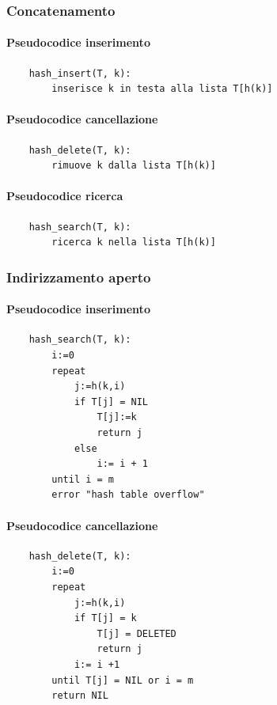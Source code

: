 \documentclass{article}
\begin{document}
\subsubsection{Concatenamento}

\paragraph{Pseudocodice inserimento}
\begin{verbatim}
    hash_insert(T, k):
        inserisce k in testa alla lista T[h(k)]
\end{verbatim}

\paragraph{Pseudocodice cancellazione}
\begin{verbatim}
    hash_delete(T, k):
        rimuove k dalla lista T[h(k)]
\end{verbatim}

\paragraph{Pseudocodice ricerca}
\begin{verbatim}
    hash_search(T, k):
        ricerca k nella lista T[h(k)]
\end{verbatim}

\subsubsection{Indirizzamento aperto}

\paragraph{Pseudocodice inserimento}
\begin{verbatim}
    hash_search(T, k):
        i:=0
        repeat
            j:=h(k,i)
            if T[j] = NIL
                T[j]:=k
                return j
            else
                i:= i + 1
        until i = m
        error "hash table overflow"
\end{verbatim}

\paragraph{Pseudocodice cancellazione}
\begin{verbatim}
    hash_delete(T, k):
        i:=0
        repeat
            j:=h(k,i)
            if T[j] = k
                T[j] = DELETED
                return j
            i:= i +1
        until T[j] = NIL or i = m
        return NIL    
\end{verbatim}
\end{document}
